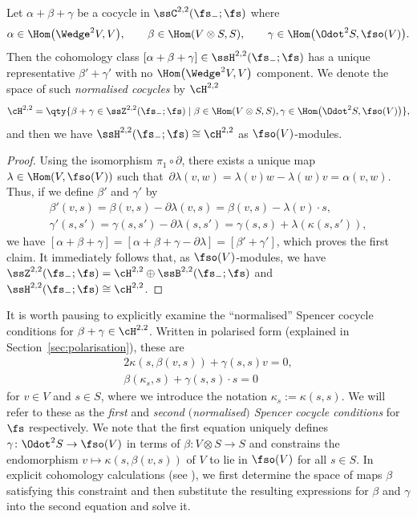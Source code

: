 \begin{Lemma} \label{lemma:H22-full-flat-model}
	Let $\alpha+\beta+\gamma$ be a cocycle in $\ssC^{2,2}(\fs_-;\fs)$ where
	\begin{align}\label{eq:22-cocycle-comps}
		\alpha\in\Hom\bigl(\Wedge^2V,V\bigr),
		\qquad\beta\in\Hom(V\otimes S,S),
		\qquad\gamma\in\Hom\bigl(\Odot^2S,\fso(V)\bigr).
	\end{align}
	Then the cohomology class $[\alpha+\beta+\gamma]\in \ssH^{2,2}(\fs_-;\fs)$ has a unique representative $\beta'+\gamma'$ with no $\Hom\bigl(\Wedge^2 V,V\bigr)$ component. We denote the space of such \emph{normalised cocycles} by $\cH^{2,2}$
	\[
		\cH^{2,2}
		= \qty{\beta+\gamma \in \ssZ^{2,2}(\fs_-;\fs)
			 \mid
				\beta\in\Hom(V\otimes S,S), \gamma\in\Hom\big(\Odot^2S,\fso(V)\big)
			},
	\]
	and then we have
$\ssH^{2,2}(\fs_-;\fs) \cong \cH^{2,2}
$
	as $\fso(V)$-modules.
\end{Lemma}

\begin{proof}
	Using the isomorphism $\pi_1\circ\partial$, there exists a unique map $\lambda\in\Hom(V,\fso(V))$ such that~${\partial\lambda(v,w)=\lambda(v)w - \lambda(w)v = \alpha(v,w)}$.
	Thus, if we define $\beta'$ and $\gamma'$ by
	\begin{gather*}%
		\beta'(v,s) = \beta(v,s) - \partial\lambda(v,s)
			= \beta(v,s) - \lambda(v)\cdot s,\\
		\gamma'(s,s') = \gamma(s,s') - \partial\lambda(s,s')
			= \gamma(s,s) + \lambda(\kappa(s,s')),
	\end{gather*}
	we have
$[\alpha+\beta+\gamma]
		= [\alpha+\beta+\gamma-\partial\lambda]
		= [\beta' + \gamma']$,
	which proves the first claim. It immediately follows that, as $\fso(V)$-modules, we have $\ssZ^{2,2}(\fs_-;\fs)=\cH^{2,2}\oplus\ssB^{2,2}(\fs_-;\fs)$ and $\ssH^{2,2}(\fs_-;\fs) \cong \cH^{2,2}$.
\end{proof}

It is worth pausing to explicitly examine the ``normalised'' Spencer cocycle conditions for $\beta+\gamma\in\cH^{2,2}$. Written in polarised form (explained in Section~\ref{sec:polarisation}), these are
\begin{gather}
	2\kappa(s,\beta(v,s)) + \gamma(s,s)v = 0, \label{eq:cocycle-1}	\\
	\beta(\kappa_s,s) + \gamma(s,s)\cdot s = 0	\label{eq:cocycle-2}
\end{gather}
for $v\in V$ and $s\in S$, where we introduce the notation $\kappa_s:=\kappa(s,s)$. We will refer to these as the \emph{first} and \emph{second} \emph{$($normalised$)$ Spencer cocycle conditions} for $\fs$ respectively. We note that the first equation uniquely defines $\gamma\colon\Odot^2S\to\fso(V)$ in terms of $\beta\colon V\otimes S\to S$ and constrains the endomorphism $v\mapsto \kappa(s,\beta(v,s))$ of $V$ to lie in $\fso(V)$ for all $s\in S$. In explicit cohomology calculations (see \cite{Beckett2021,deMedeiros2016,deMedeiros2018,Figueroa-OFarrill2017}), we first determine the space of maps $\beta$ satisfying this constraint and then substitute the resulting expressions for $\beta$ and $\gamma$ into the second equation and solve it.

